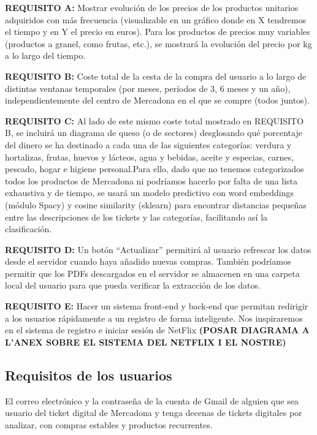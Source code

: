 \documentclass[a4paper,12pt]{report}
\begin{document}
			
		
			
			\textbf{REQUISITO A:} Mostrar evolución de los precios de los productos unitarios adquiridos con más frecuencia (visualizable en un gráfico donde en X tendremos el tiempo y en Y el precio en euros). Para los productos de precios muy variables (productos a granel, como frutas, etc.), se mostrará la evolución del precio por kg a lo largo del tiempo.
			
			\textbf{REQUISITO B:} Coste total de la cesta de la compra del usuario a lo largo de distintas ventanas temporales (por meses, períodos de 3, 6 meses y un año), independientemente del centro de Mercadona en el que se compre (todos juntos).
			
			\textbf{REQUISITO C:} Al lado de este mismo coste total mostrado en REQUISITO B, se incluirá un diagrama de queso (o de sectores) desglosando qué porcentaje del dinero se ha destinado a cada una de las siguientes categorías: verdura y hortalizas, frutas, huevos y lácteos, agua y bebidas, aceite y especias, carnes, pescado, hogar e higiene personal.Para ello, dado que no tenemos categorizados todos los productos de Mercadona ni podríamos hacerlo por falta de una lista exhaustiva y de tiempo, se usará un modelo predictivo con word embeddings (módulo Spacy) y cosine similarity (sklearn) para encontrar distancias pequeñas entre las descripciones de los tickets y las categorías, facilitando así la clasificación.
			
			
			
			\textbf{REQUISITO D:} Un botón ``Actualizar'' permitirá al usuario refrescar los datos desde el servidor cuando haya añadido nuevas compras. También podríamos permitir que los PDFs descargados en el servidor se almacenen en una carpeta local del usuario para que pueda verificar la extracción de los datos.
			
			\textbf{REQUISITO E:} Hacer un sistema front-end y back-end que permitan redirigir a los usuarios rápidamente a un registro de forma inteligente. Nos inspiraremos en el sistema de registro e iniciar sesión de NetFlix \textbf{(POSAR DIAGRAMA A L'ANEX SOBRE EL SISTEMA DEL NETFLIX I EL NOSTRE)}
			
			\subsection{Requisitos de los usuarios}
			
			El correo electrónico y la contraseña de la cuenta de Gmail de alguien que sea usuario del ticket digital de Mercadona y tenga decenas de tickets digitales por analizar, con compras estables y productos recurrentes.
			
\end{document}

